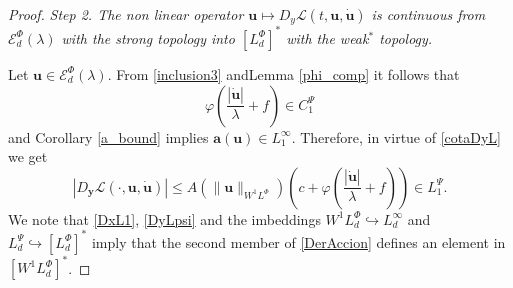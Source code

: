 \documentclass[twoside]{article}
\theoremstyle{remark}
\newcommand{\lphi}{L^{\Phi}}
\newcommand{\lpsi}{L^{\Psi}}
\newcommand{\wphi}{W^{1}\lphi}
\newcommand{\domi}{\mathcal{E}^{\Phi}_d(\lambda)}
\renewcommand{\b}[1]{\boldsymbol{#1}}
\renewcommand{\leq}{\leqslant}
\begin{document}
\begin{proof}
\noindent\emph{Step 2. The non linear operator   $\b{u}
 \mapsto  D_{y}\mathcal{L}(t,\b{u},\b{\dot{u}})$ is continuous from $\domi$ with the strong topology  into $\left[\lphi_d\right]^*$  with the weak$^*$ topology.}

 Let $\b{u}\in \domi$.  From  \eqref{inclusion3} andLemma \ref{phi_comp}  it follows that 
\begin{equation}\label{AcotOperphi}
\varphi\left(\frac{|\b{\dot{u}}|}{\lambda}+f\right)\in C^{\Psi}_1
\end{equation}
and Corollary \ref{a_bound} implies $\b{a}(\b{u})\in L^{\infty}_1$. 
Therefore, in virtue of  \eqref{cotaDyL} we get
\begin{equation}\label{DyLpsi}
   \left|D_{\b{y}}\mathcal{L}(\cdot,\b{u},\b{\dot{u}})\right|\leq  A(\|\b{u}\|_{\wphi} )  \left(c+\varphi\left( \frac{|\b{\dot{u}}|}{\lambda}+f\right  ) \right)\in\lpsi_1.
\end{equation}
 We note that \eqref{DxL1},  \eqref{DyLpsi} and the imbeddings $\wphi_d \hookrightarrow L_d^{\infty}$ and  $\lpsi_d\hookrightarrow  \left[\lphi_d\right]^*$ imply that the second member of
\eqref{DerAccion} defines an element in $\left[\wphi_d\right]^*$.


\end{proof}
\end{document}

